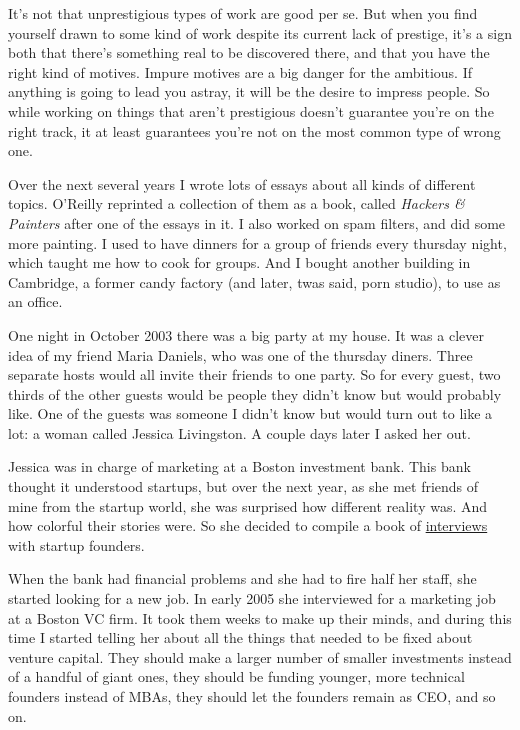 \documentclass[12pt]{book}
\begin{document}
It's not that unprestigious types of work are good per se. But when you
find yourself drawn to some kind of work despite its current lack of
prestige, it's a sign both that there's something real to be discovered
there, and that you have the right kind of motives. Impure motives are a
big danger for the ambitious. If anything is going to lead you astray,
it will be the desire to impress people. So while working on things that
aren't prestigious doesn't guarantee you're on the right track, it at
least guarantees you're not on the most common type of wrong one.

Over the next several years I wrote lots of essays about all kinds of
different topics. O'Reilly reprinted a collection of them as a book,
called \emph{Hackers \& Painters} after one of the essays in it. I also
worked on spam filters, and did some more painting. I used to have
dinners for a group of friends every thursday night, which taught me how
to cook for groups. And I bought another building in Cambridge, a former
candy factory (and later, twas said, porn studio), to use as an office.

One night in October 2003 there was a big party at my house. It was a
clever idea of my friend Maria Daniels, who was one of the thursday
diners. Three separate hosts would all invite their friends to one
party. So for every guest, two thirds of the other guests would be
people they didn't know but would probably like. One of the guests was
someone I didn't know but would turn out to like a lot: a woman called
Jessica Livingston. A couple days later I asked her out.

Jessica was in charge of marketing at a Boston investment bank. This
bank thought it understood startups, but over the next year, as she met
friends of mine from the startup world, she was surprised how different
reality was. And how colorful their stories were. So she decided to
compile a book of
\href{https://www.amazon.com/Founders-Work-Stories-Startups-Early/dp/1430210788}{interviews}
with startup founders.

When the bank had financial problems and she had to fire half her staff,
she started looking for a new job. In early 2005 she interviewed for a
marketing job at a Boston VC firm. It took them weeks to make up their
minds, and during this time I started telling her about all the things
that needed to be fixed about venture capital. They should make a larger
number of smaller investments instead of a handful of giant ones, they
should be funding younger, more technical founders instead of MBAs, they
should let the founders remain as CEO, and so on.
\end{document}
